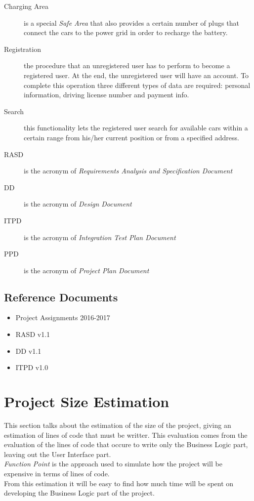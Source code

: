 \documentclass[11pt,a4paper]{report}
\begin{document}
\begin{description}
	\item[Charging Area] is a special \textit{Safe Area} that also provides a certain number of plugs that connect the cars to the power grid in order to recharge the battery.
	\item[Registration] the procedure that an unregistered user has to perform to become a registered user. At the end, the unregistered user will have an account. To complete this operation three different types of data are required: personal information, driving license number and payment info.
	\item[Search] this functionality lets the registered user search for available cars within a certain range from his/her current position or from a specified address.
	\item[RASD] is the acronym of \textit{Requirements Analysis and Specification Document}
	\item[DD] is the acronym of \textit{Design Document}
	\item[ITPD] is the acronym of \textit{Integration Test Plan Document}
	\item[PPD] is the acronym of \textit{Project Plan Document}
\end{description}
\section{Reference Documents}
	\begin{itemize}
	\item Project Assignments 2016-2017
	\item RASD v1.1
	\item DD v1.1
	\item ITPD v1.0
\end{itemize}
\chapter{Project Size Estimation}
This section talks about the estimation of the size of the project, giving an estimation of lines of code that must be writter.
This evaluation comes from the evaluation of the lines of code that occure to write only the Business Logic part, leaving out the User Interface part.\\
\textit{Function Point} is the approach used to simulate how the project will be expensive in terms of lines of code.\\
From this estimation it will be easy to find how much time will be spent on developing the Business Logic part of the project.
\end{document}
